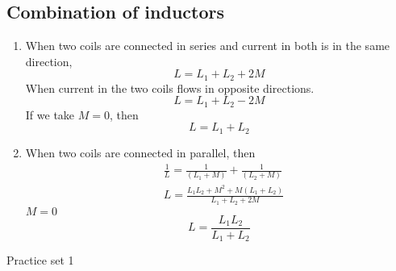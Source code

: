 \subsection{Combination of inductors}
\begin{enumerate}
	\item When two coils are connected in series and current in both is in the same direction,
	$$
	L=L_{1}+L_{2}+2 M
	$$
	When current in the two coils flows in opposite directions.
	$$
	L=L_{1}+L_{2}-2 M
	$$
	If we take $M=0$, then
	$$
	L=L_{1}+L_{2}
	$$
	\item When two coils are connected in parallel, then
	$$
	\begin{aligned}
	&\frac{1}{L}=\frac{1}{\left(L_{1}+M\right)}+\frac{1}{\left(L_{2}+M\right)} \\
	&L=\frac{L_{1} L_{2}+M^{2}+M\left(L_{1}+L_{2}\right)}{L_{1}+L_{2}+2 M}
	\end{aligned}
	$$
	$M=0$\\
	$$L=\frac{L_{1} L_{2}}{L_{1}+L_{2}}$$
\end{enumerate}
\newpage
\begin{abox}
	Practice set 1
	\end{abox}

